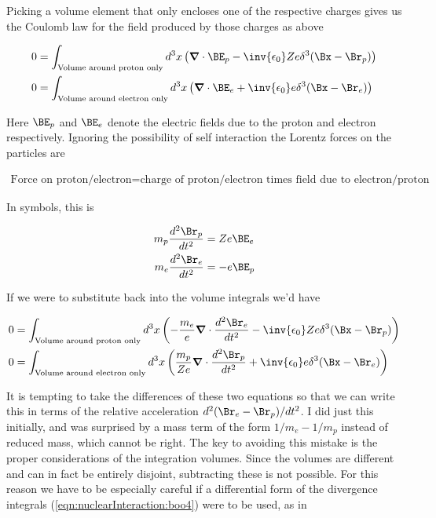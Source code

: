 Picking a volume element that only encloses one of the respective charges gives us the Coulomb law for the field produced by those charges as above

\begin{align}\label{eqn:nuclearInteraction:boo3}
0 &= \int_{\text{Volume around proton only}} d^3 x \left( \spacegrad \cdot \BE_p - \inv{\epsilon_0} Z e \delta^3(\Bx - \Br_p) \right) \\
0 &= \int_{\text{Volume around electron only}} d^3 x \left( \spacegrad \cdot \BE_e + \inv{\epsilon_0} e \delta^3(\Bx - \Br_e) \right)
\end{align}

Here $\BE_p$ and $\BE_e$ denote the electric fields due to the proton and electron respectively.  Ignoring the possibility of self interaction the Lorentz forces on the particles are

\begin{align*}
\text{Force on proton/electron} = \text{charge of proton/electron times field due to electron/proton}
\end{align*}

In symbols, this is

\begin{align}\label{eqn:nuclearInteraction:boo4}
m_p \frac{d^2 \Br_p}{dt^2} &= Z e \BE_e \\
m_e \frac{d^2 \Br_e}{dt^2} &= - e \BE_p
\end{align}

If we were to substitute back into the volume integrals we'd have

\begin{align}\label{eqn:nuclearInteraction:boo5}
0 &= \int_{\text{Volume around proton only}} d^3 x \left( -\frac{m_e}{e}\spacegrad \cdot \frac{d^2 \Br_e}{dt^2} - \inv{\epsilon_0} Z e \delta^3(\Bx - \Br_p) \right) \\
0 &= \int_{\text{Volume around electron only}} d^3 x \left( \frac{m_p}{Z e}\spacegrad \cdot \frac{d^2 \Br_p}{dt^2} + \inv{\epsilon_0} e \delta^3(\Bx - \Br_e) \right)
\end{align}

It is tempting to take the differences of these two equations so that we can write this in terms of the relative acceleration $d^2 (\Br_e - \Br_p)/dt^2$.  I did just this initially, and was surprised by a mass term of the form $1/m_e - 1/m_p$ instead of reduced mass, which cannot be right.  The key to avoiding this mistake is the proper considerations of the integration volumes.  Since the volumes are different and can in fact be entirely disjoint, subtracting these is not possible.  For this reason we have to be especially careful if a differential form of the divergence integrals (\ref{eqn:nuclearInteraction:boo4}) were to be used, as in

